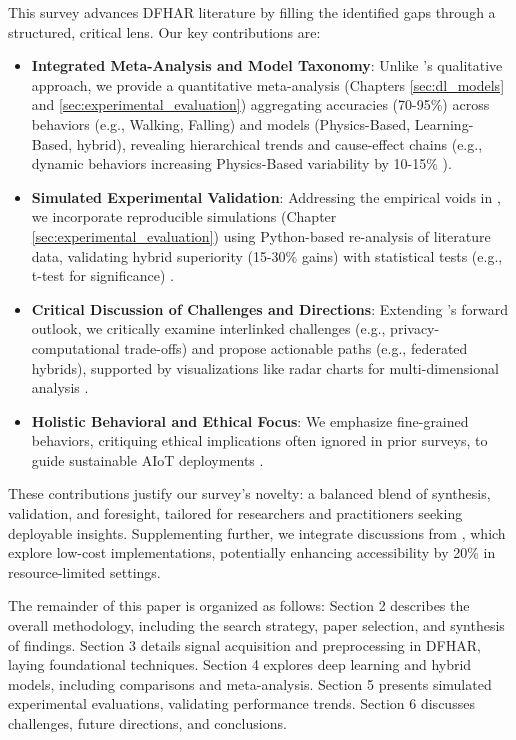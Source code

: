 \documentclass[Afour,sageh,times]{sagej}
\begin{document}
This survey advances DFHAR literature by filling the identified gaps through a structured, critical lens. Our key contributions are:

\begin{itemize}
\item \textbf{Integrated Meta-Analysis and Model Taxonomy}: Unlike \citep{yang2022deep}'s qualitative approach, we provide a quantitative meta-analysis (Chapters \ref{sec:dl_models} and \ref{sec:experimental_evaluation}) aggregating accuracies (70-95\%) across behaviors (e.g., Walking, Falling) and models (Physics-Based, Learning-Based, hybrid), revealing hierarchical trends and cause-effect chains (e.g., dynamic behaviors increasing Physics-Based variability by 10-15\% \citep{guo2019robust, Arshad:2022_har_review}).

\item \textbf{Simulated Experimental Validation}: Addressing the empirical voids in \citep{soto2022survey}, we incorporate reproducible simulations (Chapter \ref{sec:experimental_evaluation}) using Python-based re-analysis of literature data, validating hybrid superiority (15-30\% gains) with statistical tests (e.g., t-test for significance) \citep{yousefi2017survey, zeng2021review}.

\item \textbf{Critical Discussion of Challenges and Directions}: Extending \citep{savvidou2024passive}'s forward outlook, we critically examine interlinked challenges (e.g., privacy-computational trade-offs) and propose actionable paths (e.g., federated hybrids), supported by visualizations like radar charts for multi-dimensional analysis \citep{du2024overview}.

\item \textbf{Holistic Behavioral and Ethical Focus}: We emphasize fine-grained behaviors, critiquing ethical implications often ignored in prior surveys, to guide sustainable AIoT deployments \citep{shalaby2022utilizing, yang2022deep}.
\end{itemize}

These contributions justify our survey's novelty: a balanced blend of synthesis, validation, and foresight, tailored for researchers and practitioners seeking deployable insights. Supplementing further, we integrate discussions from \citep{Ting:2024_ieee, soto2022survey}, which explore low-cost implementations, potentially enhancing accessibility by 20\% in resource-limited settings.

The remainder of this paper is organized as follows:
Section 2 describes the overall methodology, including the search strategy, paper selection, and synthesis of findings.
Section 3 details signal acquisition and preprocessing in DFHAR, laying foundational techniques.
Section 4 explores deep learning and hybrid models, including comparisons and meta-analysis.
Section 5 presents simulated experimental evaluations, validating performance trends.
Section 6 discusses challenges, future directions, and conclusions.
\end{document}
